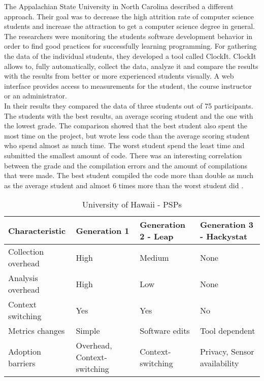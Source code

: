 The Appalachian State University in North Carolina described a different approach. Their goal was to decrease the high attrition rate of computer science students and increase the attraction to get a computer science degree in general.\\
The researchers were monitoring the students software development behavior in order to find good practices for successfully learning programming. For gathering the data of the individual students, they developed a tool called ClockIt. ClockIt allows to, fully automatically, collect the data, analyze it and compare the results with the results from better or more experienced students visually. A web interface provides access to measurements for the student, the course instructor or an administrator.\\
In their results they compared the data of three students out of 75 participants. The students with the best results, an average scoring student and the one with the lowest grade. 
The comparison showed that the best student also spent the most time on the project, but wrote less code than the average scoring student who spend almost as much time. The worst student spend the least time and submitted the smallest amount of code. There was an interesting correlation between the grade and the compilation errors and the amount of compilations that were made. The best student compiled the code more than double as much as the average student and almost 6 times more than the worst student did \cite{norris2008clockit}.

\begin{table}[ht]
  \begin{tabular}{|P{5cm}|P{3cm}|P{3cm}|P{3cm}|}
  \hline
   \textbf{Characteristic}	& \textbf{Generation 1} & \textbf{Generation 2 - Leap} & \textbf{Generation 3 - Hackystat} \\ \hline
	Collection overhead	& High 											& Medium  				& None \\ \hline
	Analysis overhead	& High 											& Low 						& None \\ \hline
	Context switching	& Yes 											& Yes 						& No \\ \hline
	Metrics changes		& Simple 										& Software edits		& Tool dependent \\ \hline
	Adoption barriers		& Overhead, Context-switching 	& Context-switching	& Privacy, Sensor availability \\ \hline
  \end{tabular}
  \newline\newline
  \caption{University of Hawaii - PSPs}\label{psps}
\end{table}

